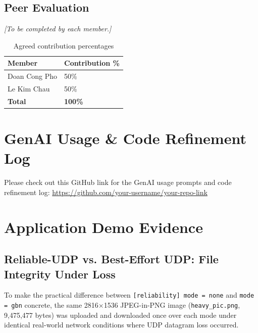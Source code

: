 \documentclass[11pt]{article}
\begin{document}

\subsection*{Peer Evaluation}
\textit{[To be completed by each member.]}

\begin{table}[htbp]
\centering
\caption{Agreed contribution percentages}
\begin{tabular}{@{}ll@{}}
\toprule
\textbf{Member} & \textbf{Contribution \%} \\
\midrule
Doan Cong Pho & 50\% \\
Le Kim Chau   & 50\% \\
\midrule
\textbf{Total} & \textbf{100\%} \\
\bottomrule
\end{tabular}
\end{table}

\clearpage
\section{GenAI Usage \& Code Refinement Log}

Please check out this GitHub link for the GenAI usage prompts and code refinement log:
\url{https://github.com/your-username/your-repo-link}



\clearpage
\section{Application Demo Evidence}

\subsection{Reliable-UDP vs. Best-Effort UDP: File Integrity Under Loss}

To make the practical difference between \texttt{[reliability] mode = none} and
\texttt{mode = gbn} concrete, the same 2816$\times$1536 JPEG-in-PNG image
(\texttt{heavy\_pic.png}, 9{,}475{,}477 bytes) was uploaded and downloaded once
over each mode under identical real-world network conditions where UDP datagram
loss occurred.
\end{document}
